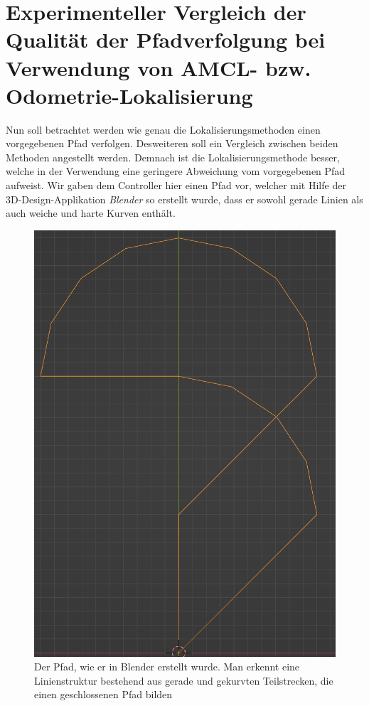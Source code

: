 \documentclass[11pt,a4paper]{article}
\begin{document}
\section{Experimenteller Vergleich der Qualität der Pfadverfolgung bei Verwendung von AMCL-  bzw. Odometrie-Lokalisierung}
Nun soll betrachtet werden wie genau die Lokalisierungsmethoden einen vorgegebenen Pfad verfolgen. Desweiteren soll ein Vergleich zwischen beiden Methoden angestellt werden. 
Demnach ist die Lokalisierungsmethode besser, welche in der Verwendung eine geringere Abweichung vom vorgegebenen Pfad aufweist. 
Wir gaben dem Controller hier einen Pfad vor, welcher mit Hilfe der 3D-Design-Applikation \textit{Blender} so erstellt wurde, dass er sowohl
gerade Linien als auch weiche und harte Kurven enthält.

\begin{figure}[ht]
\centering
\includegraphics[scale = 0.6]{pfadgrafik.png}
\caption{Der Pfad, wie er in Blender erstellt wurde. Man erkennt eine Linienstruktur bestehend aus gerade und gekurvten Teilstrecken, die einen geschlossenen Pfad bilden}
\label{fig: MessungExperiment}
\end{figure}
\end{document}
